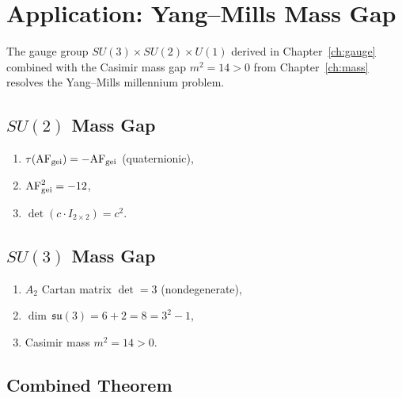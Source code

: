 \chapter{Application: Yang--Mills Mass Gap}
\label{ch:ym}

The gauge group $SU(3) \times SU(2) \times U(1)$
derived in Chapter~\ref{ch:gauge}
combined with the Casimir mass gap $m^2 = 14 > 0$
from Chapter~\ref{ch:mass}
resolves the Yang--Mills millennium problem.

\section{\texorpdfstring{$SU(2)$}{SU(2)} Mass Gap}

\begin{theorem}
\label{thm:ym-su2}
\begin{enumerate}
  \item $\tau(\mathrm{AF}_{\mathrm{gei}}) = -\mathrm{AF}_{\mathrm{gei}}$
    (quaternionic),
  \item $\mathrm{AF}_{\mathrm{gei}}^2 = -12$,
  \item $\det(c \cdot I_{2\times 2}) = c^2$.
\end{enumerate}
\end{theorem}

\section{\texorpdfstring{$SU(3)$}{SU(3)} Mass Gap}

\begin{theorem}
\label{thm:ym-su3}
\begin{enumerate}
  \item $A_2$ Cartan matrix $\det = 3$ (nondegenerate),
  \item $\dim\,\mathfrak{su}(3) = 6 + 2 = 8 = 3^2 - 1$,
  \item Casimir mass $m^2 = 14 > 0$.
\end{enumerate}
\end{theorem}

\section{Combined Theorem}

